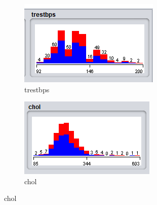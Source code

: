 \begin{figure}[H]
\medskip
\begin{subfigure}{0.38\textwidth}
  \includegraphics[width=\linewidth]{2/6.png}
  \caption{trestbps}
  \label{fig:1}
\end{subfigure}\hfil %
\begin{subfigure}{0.38\textwidth}
  \includegraphics[width=\linewidth]{2/7.png}
  \caption{chol}
  \label{fig:3}
\end{subfigure}


\end{figure}
